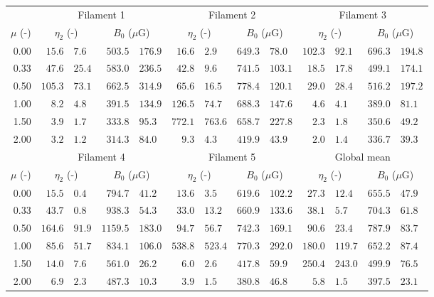 \begin{tabular}{@{}rr@{ $\pm$ }lr@{ $\pm$ }lr@{ $\pm$ }lr@{ $\pm$ }lr@{ $\pm$ }lr@{ $\pm$ }l@{}}
\toprule
{} & \multicolumn{4}{c}{Filament 1}
   & \multicolumn{4}{c}{Filament 2}
   & \multicolumn{4}{c}{Filament 3} \\
\cmidrule(lr){2-5} \cmidrule(lr){6-9} \cmidrule(lr){10-13}
$\mu$ (-) & \multicolumn{2}{c}{$\eta_2$ (-)} & \multicolumn{2}{c}{$B_0$ ($\mu$G)}
          & \multicolumn{2}{c}{$\eta_2$ (-)} & \multicolumn{2}{c}{$B_0$ ($\mu$G)}
          & \multicolumn{2}{c}{$\eta_2$ (-)} & \multicolumn{2}{c}{$B_0$ ($\mu$G)} \\
\cmidrule{1-13}
0.00 & $15.6$ & $7.6$ & $503.5$ & $176.9$
     & $16.6$ & $2.9$ & $649.3$ & $78.0$
     & $102.3$ & $92.1$ & $696.3$ & $194.8$ \\
0.33 & $47.6$ & $25.4$ & $583.0$ & $236.5$
     & $42.8$ & $9.6$ & $741.5$ & $103.1$
     & $18.5$ & $17.8$ & $499.1$ & $174.1$ \\
0.50 & $105.3$ & $73.1$ & $662.5$ & $314.9$
     & $65.6$ & $16.5$ & $778.4$ & $120.1$
     & $29.0$ & $28.4$ & $516.2$ & $197.2$ \\
1.00 & $8.2$ & $4.8$ & $391.5$ & $134.9$
     & $126.5$ & $74.7$ & $688.3$ & $147.6$
     & $4.6$ & $4.1$ & $389.0$ & $81.1$ \\
1.50 & $3.9$ & $1.7$ & $333.8$ & $95.3$
     & $772.1$ & $763.6$ & $658.7$ & $227.8$
     & $2.3$ & $1.8$ & $350.6$ & $49.2$ \\
2.00 & $3.2$ & $1.2$ & $314.3$ & $84.0$
     & $9.3$ & $4.3$ & $419.9$ & $43.9$
     & $2.0$ & $1.4$ & $336.7$ & $39.3$ \\

\midrule
{} & \multicolumn{4}{c}{Filament 4}
   & \multicolumn{4}{c}{Filament 5}
   & \multicolumn{4}{c}{Global mean} \\
\cmidrule(lr){2-5} \cmidrule(lr){6-9} \cmidrule(lr){10-13}
$\mu$ (-) & \multicolumn{2}{c}{$\eta_2$ (-)} & \multicolumn{2}{c}{$B_0$ ($\mu$G)}
          & \multicolumn{2}{c}{$\eta_2$ (-)} & \multicolumn{2}{c}{$B_0$ ($\mu$G)}
          & \multicolumn{2}{c}{$\eta_2$ (-)} & \multicolumn{2}{c}{$B_0$ ($\mu$G)} \\
\cmidrule{1-13}
0.00 & $15.5$ & $0.4$ & $794.7$ & $41.2$
     & $13.6$ & $3.5$ & $619.6$ & $102.2$
     & $27.3$ & $12.4$ & $655.5$ & $47.9$ \\
0.33 & $43.7$ & $0.8$ & $938.3$ & $54.3$
     & $33.0$ & $13.2$ & $660.9$ & $133.6$
     & $38.1$ & $5.7$ & $704.3$ & $61.8$ \\
0.50 & $164.6$ & $91.9$ & $1159.5$ & $183.0$
     & $94.7$ & $56.7$ & $742.3$ & $169.1$
     & $90.6$ & $23.4$ & $787.9$ & $83.7$ \\
1.00 & $85.6$ & $51.7$ & $834.1$ & $106.0$
     & $538.8$ & $523.4$ & $770.3$ & $292.0$
     & $180.0$ & $119.7$ & $652.2$ & $87.4$ \\
1.50 & $14.0$ & $7.6$ & $561.0$ & $26.2$
     & $6.0$ & $2.6$ & $417.8$ & $59.9$
     & $250.4$ & $243.0$ & $499.9$ & $76.5$ \\
2.00 & $6.9$ & $2.3$ & $487.3$ & $10.3$
     & $3.9$ & $1.5$ & $380.8$ & $46.8$
     & $5.8$ & $1.5$ & $397.5$ & $23.1$ \\
\bottomrule
\end{tabular}
